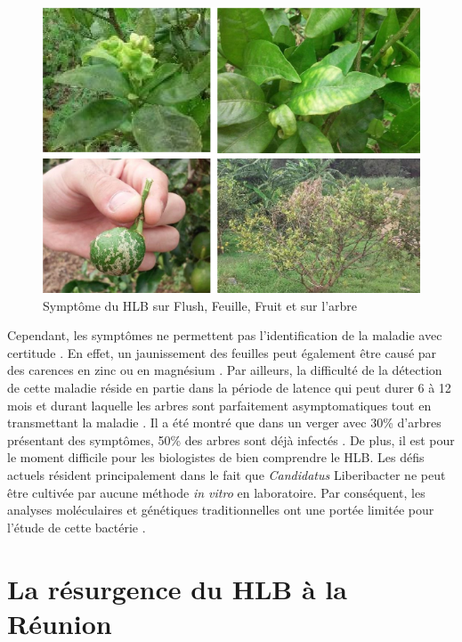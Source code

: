 \documentclass[
  11pt,
  french,
  a4paper,
  extrafontsizes,onecolumn,openright
  ]{memoir}
\begin{document}
\begin{figure}

{\centering \includegraphics[width=0.8\linewidth]{Images/Figure1} 

}

\caption{Symptôme du HLB sur Flush, Feuille, Fruit et sur l'arbre \autocite{guilloteau_utilisation_2018}}\label{fig:1}
\end{figure}

\normalsize

\vfill
\newpage

Cependant, les symptômes ne permettent pas l'identification de la maladie avec certitude \autocite{gottwald_preliminary_1989}. En effet, un jaunissement des feuilles peut également être causé par des carences en zinc ou en magnésium \autocite{aubert_greening_1989}. Par ailleurs, la difficulté de la détection de cette maladie réside en partie dans la période de latence qui peut durer 6 à 12 mois et durant laquelle les arbres sont parfaitement asymptomatiques tout en transmettant la maladie \autocite{bove_huanglongbing_2006}. Il a été montré que dans un verger avec 30\% d'arbres présentant des symptômes, 50\% des arbres sont déjà infectés \autocite{bove_huanglongbing_2006}. De plus, il est pour le moment difficile pour les biologistes de bien comprendre le HLB. Les défis actuels résident principalement dans le fait que \emph{Candidatus} Liberibacter ne peut être cultivée par aucune méthode \emph{in vitro} en laboratoire. Par conséquent, les analyses moléculaires et génétiques traditionnelles ont une portée limitée pour l'étude de cette bactérie \autocite{wang_citrus_2019}.

\vfill
\newpage

\hypertarget{la-ruxe9surgence-du-hlb-uxe0-la-ruxe9union}{%
\section{La résurgence du HLB à la Réunion}\label{la-ruxe9surgence-du-hlb-uxe0-la-ruxe9union}}
\end{document}
